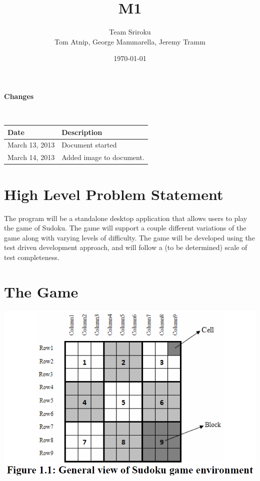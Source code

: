 \documentclass{article}
\begin{document}
\setlength{\voffset}{3.5in}
\title{M1}
\author{\Large Team Sriroku\\
Tom Atnip, George Mammarella, Jeremy Tramm}
\date{\today}
\maketitle
\clearpage
\setlength{\voffset}{0pt}
\tableofcontents
\clearpage


\begin{Large}
\textbf{Changes}
\end{Large}
\\

\begin{tabular}{ | p{1.5in} | p{4.5in} | }
\hline
\textbf{Date} & \textbf{Description}\\
\hline
\hline
March 13, 2013 & Document started\\
\hline
\hline
March 14, 2013 & Added image to document. \\
\hline
\end{tabular}
\clearpage

\section{High Level Problem Statement}
The program will be a standalone desktop application that allows users to play the game of Sudoku. The game will support a couple different variations of the game along with varying levels of difficulty. The game will be developed using the test driven development approach, and will follow a (to be determined) scale of test completeness. 

\section{The Game}

\begin{center}
\includegraphics[scale=0.5]{SudokuBoard.png}
\end{center}
\end{document}
